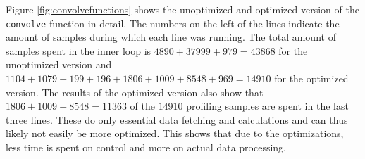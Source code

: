 \documentclass[a4paper]{article}
\begin{document}
Figure \ref{fig:convolvefunctions} shows the unoptimized and optimized version of the \texttt{convolve} function in detail. The numbers on the left of the lines indicate the amount of samples during which each line was running. The total amount of samples spent in the inner loop is $4890 + 37999+ 979 = 43868$ for the unoptimized version and $1104+1079+199+196+1806+1009+8548+969 = 14910$ for the optimized version. The results of the optimized version also show that $1806+1009+8548 = 11363$ of the $14910$ profiling samples are spent in the last three lines. These do only essential data fetching and calculations and can thus likely not easily be more optimized. This shows that due to the optimizations, less time is spent on control and more on actual data processing.\\
\\
\begin{figure}[htpb]
\end{figure}
\end{document}
